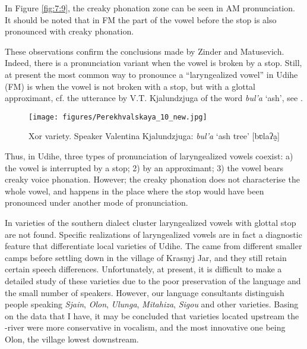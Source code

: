 \documentclass[output=paper,colorlinks,citecolor=brown]{langscibook}
\begin{document}
In Figure \ref{fig:7:9}, the creaky phonation zone can be seen in AM pronunciation. It should be noted that in FM the part of the vowel before the stop is also pronounced with creaky phonation.

These observations confirm the conclusions made by Zinder and Matusevich. Indeed, there is a pronunciation variant when the vowel is broken by a stop. Still, at present the most common way to pronounce a “laryngealized vowel” in  Udihe (FM) is when the vowel is not broken with a stop, but with a glottal approximant, cf. the utterance by V.T. Kjalundzjuga of the word \textit{bul’a} ‘ash’, see .


\begin{figure}
\texttt{[image: figures/Perekhvalskaya\_10\_new.jpg]}
\caption{Xor variety. Speaker Valentina Kjalundzjuga: \textit{bul’a} ‘ash tree’ [b{ʋ}la{ʔ}a{̰}]}
\label{fig:7:10}
\end{figure}

Thus, in  Udihe, three types of pronunciation of laryngealized vowels coexist: a) the vowel is interrupted by a stop; 2) by an approximant; 3) the vowel bears creaky voice phonation. However; the creaky phonation does not characterise the whole vowel, and happens in the place where the stop would have been pronounced under another mode of pronunciation.

\largerpage

In varieties of the southern dialect cluster laryngealized vowels with glottal stop are not found. Specific realizations of laryngealized vowels are in fact a diagnostic feature that differentiate local varieties of  Udihe. The  came from different smaller camps before settling down in the village of Krasnyj Jar, and they still retain certain speech differences. Unfortunately, at present, it is difficult to make a detailed study of these varieties due to the poor preservation of the language and the small number of speakers. However, our language consultants distinguish people speaking \textit{Sjain}, \textit{Olon}, \textit{Ulunga}, \textit{Mitahiza}, \textit{Sigou} and other varieties. Basing on the data that I have, it may be concluded that  varieties located upstream the -river were more conservative in vocalism, and the most innovative one being Olon, the village lowest downstream.
\end{document}
